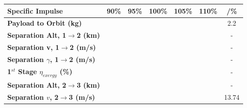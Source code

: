 \begin{table}[ht!]
	\centering
	\begin{tabular}{l c c c c c c} 
		\hline \textbf{Specific Impulse}
		&90\%
		&95\%
		&100\%
		&105\%
		&110\%
		& /\%
		\\
		\hline \textbf{Payload to Orbit (kg)}
		& \PayloadToOrbitIspNinetyNoReturn
		& \PayloadToOrbitIspNinetyFiveNoReturn
		& \PayloadToOrbitIspStandardNoReturn
		& \PayloadToOrbitIspOneHundredFiveNoReturn
		& \PayloadToOrbitIspOneHundredTenNoReturn
		&2.2
		\\
		\textbf{Separation Alt, 1$\rightarrow$2 (km)}
		& \firstsecondSeparationAltIspNinetyNoReturn
		& \firstsecondSeparationAltIspNinetyFiveNoReturn
		& \firstsecondSeparationAltIspStandardNoReturn
		& \firstsecondSeparationAltIspOneHundredFiveNoReturn
		& \firstsecondSeparationAltIspOneHundredTenNoReturn
		& -
		\\
		\textbf{Separation v, 1$\rightarrow$2 (m/s)}
		& \firstsecondSeparationvIspNinetyNoReturn
		& \firstsecondSeparationvIspNinetyFiveNoReturn
		& \firstsecondSeparationvIspStandardNoReturn
		& \firstsecondSeparationvIspOneHundredFiveNoReturn
		& \firstsecondSeparationvIspOneHundredTenNoReturn
		& -
		\\
		\textbf{Separation $\gamma$, 1$\rightarrow$2 (m/s)}
		& \firstsecondSeparationgammaIspNinetyNoReturn
		& \firstsecondSeparationgammaIspNinetyFiveNoReturn
		& \firstsecondSeparationgammaIspStandardNoReturn
		& \firstsecondSeparationgammaIspOneHundredFiveNoReturn
		& \firstsecondSeparationgammaIspOneHundredTenNoReturn
		& -
		\\
		\textbf{1$^{st}$ Stage $\eta_{exergy}$ (\%)}
		& \firstExergyEffIspNinetyNoReturn
		& \firstExergyEffIspNinetyFiveNoReturn
		& \firstExergyEffIspStandardNoReturn
		& \firstExergyEffIspOneHundredFiveNoReturn
		& \firstExergyEffIspOneHundredTenNoReturn
		& -
		\\
		\textbf{Separation Alt, 2$\rightarrow$3 (km)}
		& \secondthirdSeparationAltIspNinetyNoReturn
		& \secondthirdSeparationAltIspNinetyFiveNoReturn
		& \secondthirdSeparationAltIspStandardNoReturn
		& \secondthirdSeparationAltIspOneHundredFiveNoReturn
		& \secondthirdSeparationAltIspOneHundredTenNoReturn
		& -
		\\
		\textbf{Separation $v$, 2$\rightarrow$3 (m/s)}
		& \secondthirdSeparationvIspNinetyNoReturn
		& \secondthirdSeparationvIspNinetyFiveNoReturn
		& \secondthirdSeparationvIspStandardNoReturn
		& \secondthirdSeparationvIspOneHundredFiveNoReturn
		& \secondthirdSeparationvIspOneHundredTenNoReturn
		&13.74

\end{tabular}
\end{table}
